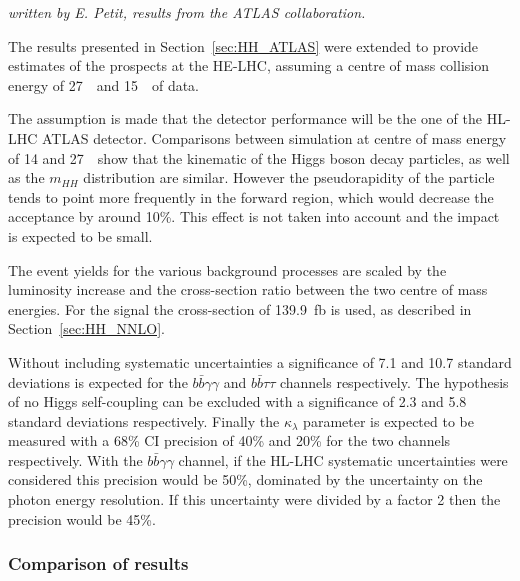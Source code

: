 \label{sec:HH_HE_atlas}
\begin{center}
\textit{written by E. Petit, results from the ATLAS collaboration.}
\end{center}

The results presented in Section~\ref{sec:HH_ATLAS} were extended to provide estimates of the prospects at the HE-LHC, assuming a centre of mass collision energy of 27~\TeV\ and 15~\abinv\ of data.

The assumption is made that the detector performance will be the one of the HL-LHC ATLAS detector. Comparisons between simulation at centre of mass energy of 14 and 27~\TeV\ show that the kinematic of the Higgs boson decay particles, as well as the $m_{HH}$ distribution are similar. However the pseudorapidity of the particle tends to point more frequently in the forward region, which would decrease the acceptance by around 10\%. This effect is not taken into account and the impact is expected to be small.

The event yields for the various background processes are scaled by the luminosity increase and the cross-section ratio between the two centre of mass energies. For the signal the cross-section of 139.9~fb is used, as described in Section~\ref{sec:HH_NNLO}.

Without including systematic uncertainties a significance of 7.1 and 10.7 standard deviations is expected for the $b\bar{b}\gamma\gamma$ and $b\bar{b}\tau\tau$ channels respectively.
The hypothesis of no Higgs self-coupling can be excluded with a significance of 2.3 and 5.8 standard deviations respectively. Finally the $\kappa_{\lambda}$ parameter is expected to be measured with a 68\% CI precision of 40\% and 20\% for the two channels respectively.
With the $b\bar{b}\gamma\gamma$ channel, if the HL-LHC systematic uncertainties were considered this precision would be 50\%, dominated by the uncertainty on the photon energy resolution. If this uncertainty were divided by a factor 2 then the precision would be 45\%.



\subsubsection{Comparison of results}

